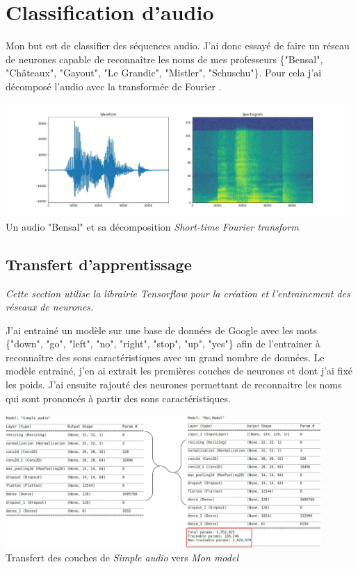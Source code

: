 \documentclass[12pt,a4paper, french]{article}
\begin{document}
\section{Classification d'audio }
Mon but est de classifier des séquences audio. J'ai donc essayé de faire un réseau de neurones capable de reconnaître les noms de mes professeurs \{"Bensal", "Châteaux", "Gayout", "Le Grandic", "Mistler", "Schuschu"\}. Pour cela j'ai décomposé l'audio avec la transformée de Fourier .

\begin{center}
    \includegraphics[width=13cm]{4-Audio Bensaal.jpg} \\
    Un audio "Bensal" et sa décomposition \textit{Short-time Fourier transform}
\end{center}

\subsection{Transfert d'apprentissage}
\textit{Cette section utilise la librairie Tensorflow pour la création et l'entrainement des réseaux de neurones.}  
  
J'ai entrainé un modèle sur une base de données de Google avec les mots \{"down", "go", "left", "no", "right", "stop", "up", "yes"\} afin de l'entrainer à reconnaître des sons caractéristiques avec un grand nombre de données. Le modèle entrainé, j'en ai extrait les premières couches de neurones et dont j'ai fixé les poids. J'ai ensuite rajouté des neurones permettant de reconnaitre les noms qui sont prononcés à partir des sons caractéristiques.
\begin{center}
    \includegraphics[width=12cm]{4-Transfert Learning.jpg} \\
    Transfert des couches de \textit{Simple audio} vers \textit{Mon model}
\end{center}
\end{document}
